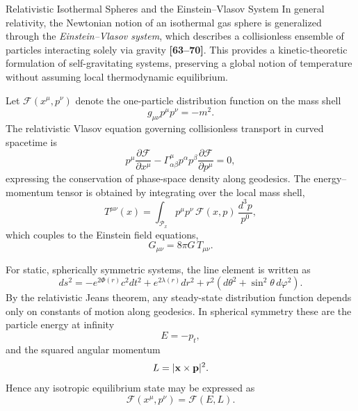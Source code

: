 \documentclass[12pt,a4paper]{article}
\numberwithin{equation}{section}
\begin{document}
\begin{section}{Relativistic Isothermal Spheres and the Einstein--Vlasov System}
In general relativity, the Newtonian notion of an isothermal gas sphere is generalized through the \emph{Einstein--Vlasov system}, which describes a collisionless ensemble of particles interacting solely via gravity \textbf{[63--70]}. This provides a kinetic-theoretic formulation of self-gravitating systems, preserving a global notion of temperature without assuming local thermodynamic equilibrium.

Let $\mathcal{F}(x^\mu,p^\nu)$ denote the one-particle distribution function on the mass shell
\begin{equation}
g_{\mu\nu} p^\mu p^\nu = - m^2.
\end{equation}
The relativistic Vlasov equation governing collisionless transport in curved spacetime is
\begin{equation}
p^\mu \frac{\partial \mathcal{F}}{\partial x^\mu}
 - \Gamma^\mu_{\alpha\beta} p^\alpha p^\beta
   \frac{\partial \mathcal{F}}{\partial p^\mu} = 0,
\end{equation}
expressing the conservation of phase-space density along geodesics. The energy--momentum tensor is obtained by integrating over the local mass shell,
\begin{equation}
T^{\mu\nu}(x) = \int_{\mathcal{P}_x} p^\mu p^\nu \,
\mathcal{F}(x,p) \, \frac{d^3 p}{p^0},
\end{equation}
which couples to the Einstein field equations,
\begin{equation}
G_{\mu\nu} = 8\pi G \, T_{\mu\nu}.
\end{equation}

For static, spherically symmetric systems, the line element is written as
\begin{equation}
ds^2 = - e^{2\Phi(r)} c^2 dt^2 + e^{2\lambda(r)} dr^2
       + r^2 (d\theta^2 + \sin^2\theta \, d\varphi^2).
\end{equation}
By the relativistic Jeans theorem, any steady-state distribution function depends only on constants of motion along geodesics. In spherical symmetry these are the particle energy at infinity
\begin{equation}
E = -p_t,
\end{equation}
and the squared angular momentum
\begin{equation}
L = |{\bf x} \times {\bf p}|^2.
\end{equation}
Hence any isotropic equilibrium state may be expressed as
\begin{equation}
\mathcal{F}(x^\mu,p^\nu) = \mathcal{F}(E,L).
\end{equation}


\end{section}
\end{document}
